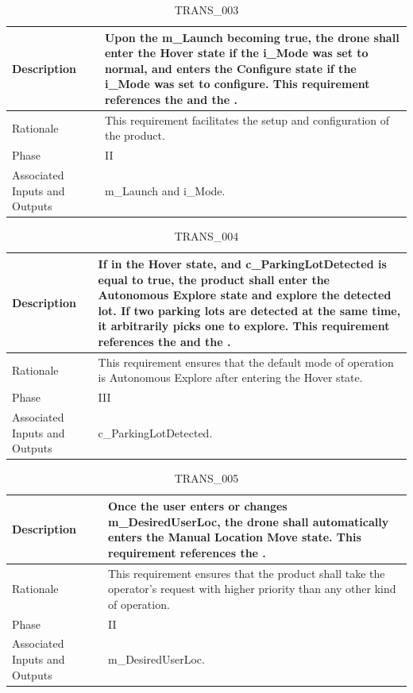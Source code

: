 \documentclass{article}
\begin{document}
\begin{table}[!h]
\begin{center}
\caption {TRANS\_003} 
\label{TRANS_003}
\begin{tabular}{ | m{3cm} | m{11cm} | }
\hline
Description & Upon the m\_Launch becoming true, the drone shall enter the Hover state if the i\_Mode was set to normal, and enters the Configure state if the i\_Mode was set to configure. This requirement references the \nameref{Hover State} and the \nameref{Configure State}. \\
\hline
Rationale & This requirement facilitates the setup and configuration of the product.  \\
\hline
Phase & II \\
\hline
Associated Inputs and Outputs & m\_Launch and i\_Mode. \\
\hline
\end{tabular}
\end{center}
\end{table}

\begin{table}[!h]
\begin{center}
\caption {TRANS\_004} 
\label{TRANS_004}
\begin{tabular}{ | m{3cm} | m{11cm} | }
\hline
Description & If in the Hover state, and c\_ParkingLotDetected is equal to true, the product shall enter the Autonomous Explore state and explore the detected lot. If two parking lots are detected at the same time, it arbitrarily picks one to explore. This requirement references the \nameref{Hover State} and the \nameref{Autonomous Explore State}. \\
\hline
Rationale & This requirement ensures that the default mode of operation is Autonomous Explore after entering the Hover state.  \\
\hline
Phase & III \\
\hline
Associated Inputs and Outputs & c\_ParkingLotDetected. \\
\hline
\end{tabular}
\end{center}
\end{table}

\begin{table}[!h]
\begin{center}
\caption {TRANS\_005} 
\label{TRANS_005}
\begin{tabular}{ | m{3cm} | m{11cm} | }
\hline
Description & Once the user enters or changes m\_DesiredUserLoc, the drone shall automatically enters the Manual Location Move state. This requirement references the \nameref{Manual Location Move State}. \\
\hline
Rationale & This requirement ensures that the product shall take the operator's request with higher priority than any other kind of operation. \\
\hline
Phase & II \\
\hline
Associated Inputs and Outputs & m\_DesiredUserLoc. \\
\hline
\end{tabular}
\end{center}
\end{table}
\end{document}
